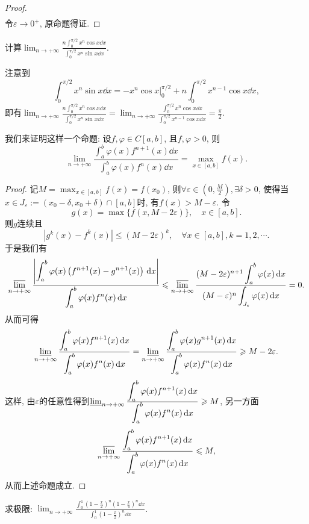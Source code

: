 \begin{quizb}
\begin{proof}
\[\begin{split}
\end{split}\]
令\(\varepsilon\rightarrow 0^+\), 原命题得证.
\end{proof}
\woe 计算\(\lim_{n\rightarrow+\infty}\frac{n\displaystyle\int_{0}^{\pi/2}x^n\cos x\dd x}{\displaystyle\int_{0}^{\pi/2}x^n\sin x\dd x}.\)
\begin{solution}
注意到\[\int_{0}^{\pi/2}x^n\sin x\dd x=-x^n\cos x\big|_0^{\pi/2}+n\int_{0}^{\pi/2}x^{n-1}\cos x\dd x,\]即有\(\lim_{n\rightarrow+\infty}\frac{n\displaystyle\int_{0}^{\pi/2}x^n\cos x\dd x}{\displaystyle\int_{0}^{\pi/2}x^n\sin x\dd x}=\lim_{n\rightarrow+\infty}\frac{\displaystyle\int_{0}^{\pi/2}x^n\cos x\dd x}{\displaystyle\int_{0}^{\pi/2}x^{n-1}\cos x\dd x}=\frac{\pi}{2}.\)
\end{solution}
我们来证明这样一个命题: 设\(f,\varphi\in C[a,b]\), 且\(f,\varphi>0\), 则\[\lim_{n\rightarrow+\infty}\frac{\displaystyle\int_{a}^{b}\varphi(x)f^{n+1}(x)\dd x}{\displaystyle\int_{a}^{b}\varphi(x)f^n(x)\dd x}=\max_{x\in[a,b]}f(x).\]
\begin{proof}
记\(M=\max_{x\in[a,b]}f(x)=f(x_0)\), 则\(\forall\varepsilon\in\left(0,\frac{M}{2}\right),\exists\delta>0\), 使得当\(x\in J_\varepsilon:=(x_0-\delta,x_0+\delta)\cap[a,b]\)时, 有\(f(x)>M-\varepsilon\). 令\[g(x)=\max\{f(x,M-2\varepsilon)\},\quad x\in[a,b].\]则\(g\)连续且\[|g^k(x)-f^k(x)|\leqslant (M-2\varepsilon)^k,\quad\forall x\in[a,b],k=1,2,\cdots.\]
于是我们有\[\varlimsup_{n\rightarrow+\infty}\frac{\left|\displaystyle\int_{a}^{b}\varphi(x)\left(f^{n+1}(x)-g^{n+1}(x)\right)\,\mathrm{d} x\right|}{\displaystyle\int_{a}^{b}\varphi(x)f^n(x)\,\mathrm{d} x}\leqslant\varlimsup_{n\rightarrow+\infty}\frac{(M-2\varepsilon)^{n+1}\displaystyle\int_{a}^{b}\varphi(x)\,\mathrm{d} x}{(M-\varepsilon)^n\displaystyle\int_{J_{\varepsilon}}\varphi(x)\,\mathrm{d} x}=0.\]
从而可得\[\varliminf_{n\rightarrow+\infty}\frac{\displaystyle\int_{a}^{b}\varphi(x)f^{n+1}(x)\,\mathrm{d} x}{\displaystyle\int_{a}^{b}\varphi(x)f^n(x)\,\mathrm{d} x}=\varliminf_{n\rightarrow+\infty}\frac{\displaystyle\int_{a}^{b}\varphi(x)g^{n+1}(x)\,\mathrm{d} x}{\displaystyle\int_{a}^{b}\varphi(x)f^n(x)\,\mathrm{d} x}\geqslant M-2\varepsilon.\]
这样, 由\(\varepsilon\)的任意性得到\(\varliminf_{n\rightarrow+\infty}\frac{\displaystyle\int_{a}^{b}\varphi(x)f^{n+1}(x)\,\mathrm{d} x}{\displaystyle\int_{a}^{b}\varphi(x)f^n(x)\,\mathrm{d} x}\geqslant M\), 另一方面\[\varlimsup_{n\rightarrow+\infty}\frac{\displaystyle\int_{a}^{b}\varphi(x)f^{n+1}(x)\,\mathrm{d} x}{\displaystyle\int_{a}^{b}\varphi(x)f^n(x)\,\mathrm{d} x}\leqslant M,\]从而上述命题成立.
\end{proof}
\woe 求极限: \(\lim_{n\rightarrow+\infty}\frac{\displaystyle\int_{0}^{1}\left(1-\frac{x}{2}\right)^n\left(1-\frac{x}{4}\right)^n\dd x}{\displaystyle\int_{0}^{1}\left(1-\frac{x}{2}\right)^n\dd x}\).

\end{quizb}
